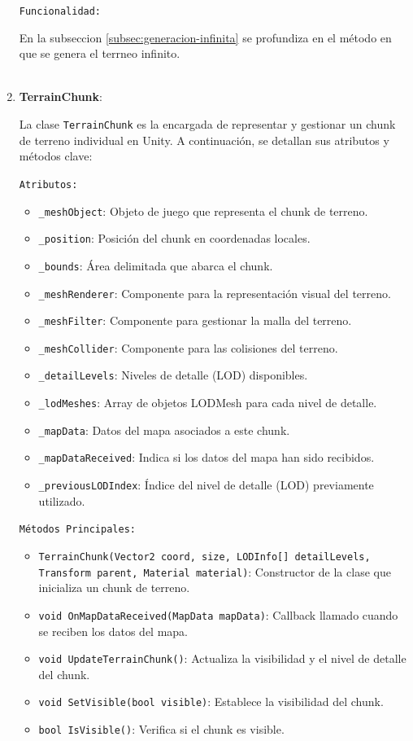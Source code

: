 \begin{enumerate}
    \texttt{Funcionalidad:}

    En la subseccion \ref{subsec:generacion-infinita} se profundiza en el método en que se genera el terrneo infinito.\\
    \\

    \item \textbf{TerrainChunk}:

    La clase \texttt{TerrainChunk} es la encargada de representar y gestionar un chunk de terreno individual en Unity. A continuación, se detallan sus atributos y métodos clave:

    \texttt{Atributos:}

    \begin{itemize}
        \item \texttt{\_meshObject}: Objeto de juego que representa el chunk de terreno.
        \item \texttt{\_position}: Posición del chunk en coordenadas locales.
        \item \texttt{\_bounds}: Área delimitada que abarca el chunk.
        \item \texttt{\_meshRenderer}: Componente para la representación visual del terreno.
        \item \texttt{\_meshFilter}: Componente para gestionar la malla del terreno.
        \item \texttt{\_meshCollider}: Componente para las colisiones del terreno.
        \item \texttt{\_detailLevels}: Niveles de detalle (LOD) disponibles.
        \item \texttt{\_lodMeshes}: Array de objetos LODMesh para cada nivel de detalle.
        \item \texttt{\_mapData}: Datos del mapa asociados a este chunk.
        \item \texttt{\_mapDataReceived}: Indica si los datos del mapa han sido recibidos.
        \item \texttt{\_previousLODIndex}: Índice del nivel de detalle (LOD) previamente utilizado.
    \end{itemize}

    \texttt{Métodos Principales:}

    \begin{itemize}
        \item \texttt{TerrainChunk(Vector2 coord,  size, LODInfo[] detailLevels, Transform parent, Material material)}: Constructor de la clase que inicializa un chunk de terreno.
        \item \texttt{void OnMapDataReceived(MapData mapData)}: Callback llamado cuando se reciben los datos del mapa.
        \item \texttt{void UpdateTerrainChunk()}: Actualiza la visibilidad y el nivel de detalle del chunk.
        \item \texttt{void SetVisible(bool visible)}: Establece la visibilidad del chunk.
        \item \texttt{bool IsVisible()}: Verifica si el chunk es visible.
    \end{itemize}


\end{enumerate}
